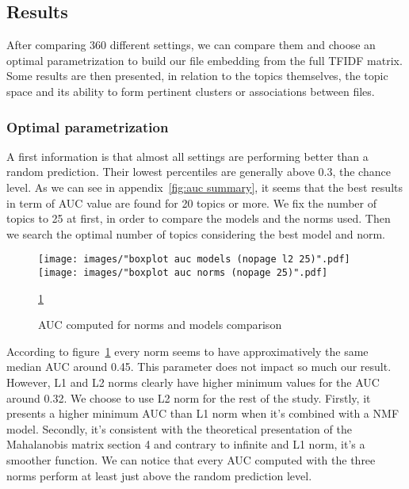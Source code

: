 \documentclass[a4paper]{article}
\begin{document}
	\subsection{Results}	
	
	After comparing 360 different settings, we can compare them and choose an optimal parametrization to build our file embedding from the full \ac{TFIDF} matrix. Some results are then presented, in relation to the topics themselves, the topic space and its ability to form pertinent clusters or associations between files.
	
	\subsubsection{Optimal parametrization}
	
	A first information is that almost all settings are performing better than a random prediction. Their lowest percentiles are generally above 0.3, the chance level. As we can see in appendix~\ref{fig:auc summary}, it seems that the best results in term of \ac{AUC} value are found for 20 topics or more. We fix the number of topics to 25 at first, in order to compare the models and the norms used. Then we search the optimal number of topics considering the best model and norm.\\
	
	\begin{figure}[]
		\texttt{[image: images/"boxplot auc models (nopage l2 25)".pdf]}
		\label{fig:gridsearch-models}
		\endminipage\hfill
		\texttt{[image: images/"boxplot auc norms (nopage 25)".pdf]}
		\label{fig:gridsearch-norms}
		\endminipage
		\caption{AUC computed for norms and models comparison}
		\label{fig:gridsearch}
		\ref{fig:gridsearch}
	\end{figure}

	According to figure~\ref{fig:gridsearch} every norm seems to have approximatively the same median \ac{AUC} around 0.45. This parameter does not impact so much our result. However, L1 and L2 norms clearly have higher minimum values for the \ac{AUC} around 0.32. We choose to use L2 norm for the rest of the study. Firstly, it presents a higher minimum \ac{AUC} than L1 norm when it's combined with a \ac{NMF} model. Secondly, it's consistent with the theoretical presentation of the Mahalanobis matrix section 4 and contrary to infinite and L1 norm, it's a smoother function. We can notice that every \ac{AUC} computed with the three norms perform at least just above the random prediction level.
	
\end{document}
